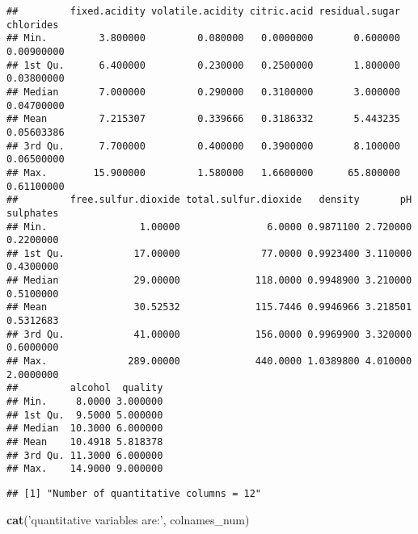 \documentclass[
]{article}
\newenvironment{Shaded}{\begin{snugshade}}{\end{snugshade}}
\newcommand{\KeywordTok}[1]{\textcolor[rgb]{0.13,0.29,0.53}{\textbf{#1}}}
\newcommand{\NormalTok}[1]{#1}
\newcommand{\OperatorTok}[1]{\textcolor[rgb]{0.81,0.36,0.00}{\textbf{#1}}}
\newcommand{\StringTok}[1]{\textcolor[rgb]{0.31,0.60,0.02}{#1}}
\begin{document}
\begin{verbatim}
##         fixed.acidity volatile.acidity citric.acid residual.sugar  chlorides
## Min.         3.800000         0.080000   0.0000000       0.600000 0.00900000
## 1st Qu.      6.400000         0.230000   0.2500000       1.800000 0.03800000
## Median       7.000000         0.290000   0.3100000       3.000000 0.04700000
## Mean         7.215307         0.339666   0.3186332       5.443235 0.05603386
## 3rd Qu.      7.700000         0.400000   0.3900000       8.100000 0.06500000
## Max.        15.900000         1.580000   1.6600000      65.800000 0.61100000
##         free.sulfur.dioxide total.sulfur.dioxide   density       pH sulphates
## Min.                1.00000               6.0000 0.9871100 2.720000 0.2200000
## 1st Qu.            17.00000              77.0000 0.9923400 3.110000 0.4300000
## Median             29.00000             118.0000 0.9948900 3.210000 0.5100000
## Mean               30.52532             115.7446 0.9946966 3.218501 0.5312683
## 3rd Qu.            41.00000             156.0000 0.9969900 3.320000 0.6000000
## Max.              289.00000             440.0000 1.0389800 4.010000 2.0000000
##         alcohol  quality
## Min.     8.0000 3.000000
## 1st Qu.  9.5000 5.000000
## Median  10.3000 6.000000
## Mean    10.4918 5.818378
## 3rd Qu. 11.3000 6.000000
## Max.    14.9000 9.000000
\end{verbatim}

\begin{Shaded}
\end{Shaded}

\begin{verbatim}
## [1] "Number of quantitative columns = 12"
\end{verbatim}

\begin{Shaded}
\begin{Highlighting}[]
\KeywordTok{cat}\NormalTok{(}\StringTok{'quantitative variables are:'}\NormalTok{, colnames_num)}
\end{Highlighting}
\end{Shaded}
\end{document}
